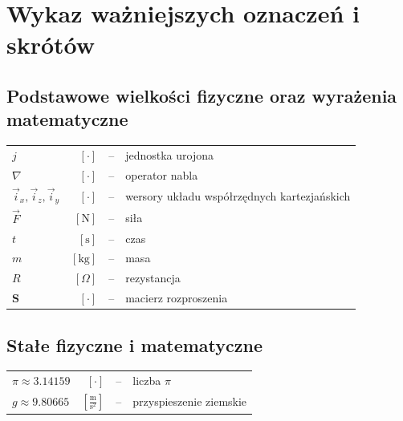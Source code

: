 
\chapter*{Wykaz ważniejszych oznaczeń i skrótów}
{}

\section*{Podstawowe wielkości fizyczne oraz wyrażenia matematyczne}
\noindent
\begin{tabular}{l r c l}
     $j$  &$[\cdot]$  &--&jednostka urojona\\
	 $\nabla$  &$[\cdot]$  &--&operator nabla\\
	 $\vec{i}_{x},\vec{i}_{z},\vec{i}_{y} $ &$[\cdot]$  &--& wersory układu współrzędnych kartezjańskich    \\
	 $\vec{F}$ &$[\text{N}]$  &--& siła \\
	 $t $ &$[\text{s}]$  &--& czas \\
	 $m$  &$[\text{kg}]$  &--& masa \\
	 $R$  &$[\Omega]$  &--&rezystancja\\
	 $\mathbf{S}$  &$[\cdot]$  &--&macierz rozproszenia\\
\end{tabular}

\section*{Stałe fizyczne i matematyczne}
\noindent
	 \begin{tabular}{l r c l}
	$\pi \approx 3.14159 $&$[\cdot]  $ &--& liczba $\pi$\\ 
	$g \approx 9.80665 $&$[\frac{\text{m}}{\text{s}^2}]  $ &--& przyspieszenie ziemskie\\
\end{tabular}

